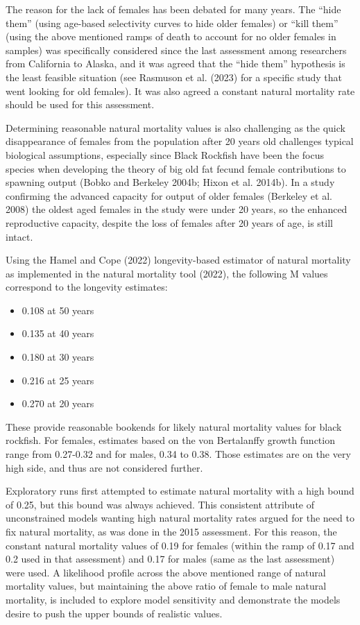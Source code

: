 \documentclass[11pt,
  letterpaper,
]{article}
\providecommand{\tightlist}{%
  \setlength{\itemsep}{0pt}\setlength{\parskip}{0pt}}
\providecommand{\tightlist}{%
  \setlength{\itemsep}{0pt}\setlength{\parskip}{0pt}}
\begin{document}
The reason for the lack of females has been debated for many years. The ``hide them'' (using age-based selectivity curves to hide older females) or ``kill them'' (using the above mentioned ramps of death to account for no older females in samples) was specifically considered since the last assessment among researchers from California to Alaska, and it was agreed that the ``hide them'' hypothesis is the least feasible situation (see Rasmuson et al. (2023) for a specific study that went looking for old females). It was also agreed a constant natural mortality rate should be used for this assessment.

Determining reasonable natural mortality values is also challenging as the quick disappearance of females from the population after 20 years old challenges typical biological assumptions, especially since Black Rockfish have been the focus species when developing the theory of big old fat fecund female contributions to spawning output (Bobko and Berkeley 2004b; Hixon et al. 2014b). In a study confirming the advanced capacity for output of older females (Berkeley et al. 2008) the oldest aged females in the study were under 20 years, so the enhanced reproductive capacity, despite the loss of females after 20 years of age, is still intact.

Using the Hamel and Cope (2022) longevity-based estimator of natural mortality as implemented in the natural mortality tool (2022), the following M values correspond to the longevity estimates:

\begin{itemize}
\tightlist
\item
  0.108 at 50 years
\item
  0.135 at 40 years
\item
  0.180 at 30 years
\item
  0.216 at 25 years
\item
  0.270 at 20 years
\end{itemize}

These provide reasonable bookends for likely natural mortality values for black rockfish. For females, estimates based on the von Bertalanffy growth function range from 0.27-0.32 and for males, 0.34 to 0.38. Those estimates are on the very high side, and thus are not considered further.

Exploratory runs first attempted to estimate natural mortality with a high bound of 0.25, but this bound was always achieved. This consistent attribute of unconstrained models wanting high natural mortality rates argued for the need to fix natural mortality, as was done in the 2015 assessment. For this reason, the constant natural mortality values of 0.19 for females (within the ramp of 0.17 and 0.2 used in that assessment) and 0.17 for males (same as the last assessment) were used. A likelihood profile across the above mentioned range of natural mortality values, but maintaining the above ratio of female to male natural mortality, is included to explore model sensitivity and demonstrate the models desire to push the upper bounds of realistic values.
\end{document}
